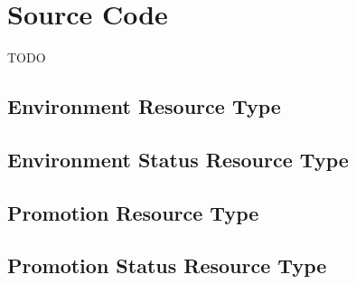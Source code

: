 \chapter{Source Code}\label{appendix:source-code}

TODO

\section{Environment Resource Type}
\label{appendix:source-code:environmentSpec-type}





\section{Environment Status Resource Type}
\label{appendix:source-code:environmentStatusSpec-type}






\section{Promotion Resource Type}
\label{appendix:source-code:promotionSpec-type}





\section{Promotion Status Resource Type}
\label{appendix:source-code:promotionStatusSpec-type}





